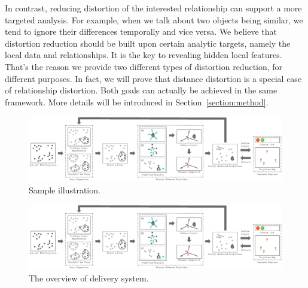 In contrast, reducing distortion of the interested relationship can support a more targeted analysis. For example, when we talk about two objects being similar, we tend to ignore their differences temporally and vice versa. We believe that distortion reduction should be built upon certain analytic targets, namely the local data and relationships. It is the key to revealing hidden local features. That's the reason we provide two different types of distortion reduction, for different purposes. In fact, we will prove that distance distortion is a special case of relationship distortion. Both goals can actually be achieved in the same framework. More details will be introduced in Section~\ref{section:method}.

\ifx
\begin{figure}[htb]
\centering
\includegraphics{images/Pipeline.eps}
\caption{Sample illustration.}
\end{figure}
\else
\begin{figure}[htbp]
\centering
  \includegraphics[width=1\linewidth]{images/Pipeline.eps}%
  \caption{The overview of delivery system.}
\label{fig:workflow}
  \end{figure}
  \fi

